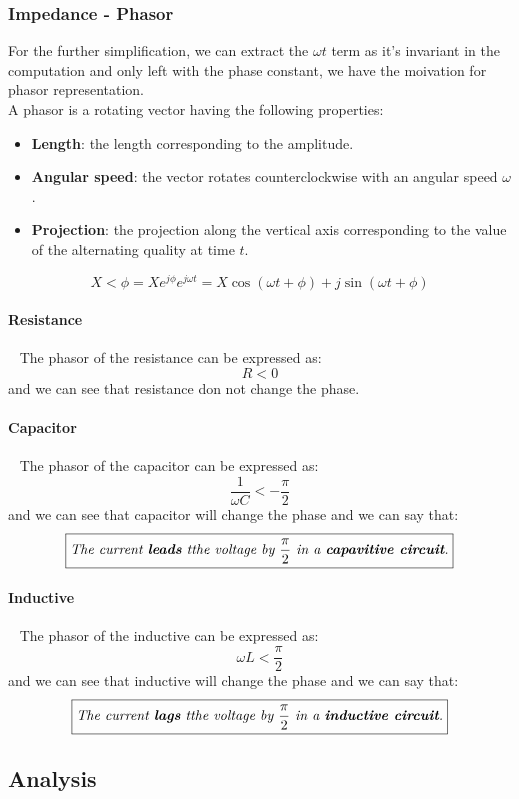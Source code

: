 \documentclass[UTF8]{article}
\begin{document}
\subsubsection{Impedance - Phasor} 
For the further simplification, we can extract the $\omega t$ term as it's invariant in the computation and only left with the phase constant, we have the moivation for phasor representation. \\ 
A phasor is a rotating vector having the following properties:
\begin{itemize}
\item  {\textbf{Length}}: the length corresponding to the amplitude.
\item  {\textbf{Angular speed}}: the vector rotates counterclockwise with an angular speed $\omega $.
\item  {\textbf{Projection}}: the projection along the vertical axis corresponding to the value of the alternating quality at time $t$.
\end{itemize}
$$X<\phi = Xe^{j\phi}e^{j\omega t} = X\cos (\omega t+\phi)+j\sin (\omega t+\phi)$$

\paragraph{Resistance}
~ {The phasor of the resistance can be expressed as:}
$$R<0$$
 {and we can see that resistance don not change the phase.}

\paragraph{Capacitor}
~ {The phasor of the capacitor can be expressed as:}
$$\dfrac{1}{\omega C}<-\dfrac{\pi}{2}$$
 {and we can see that capacitor will change the phase and we can say that:}
$$\boxed{\textit{The current \textbf{leads} tthe voltage by }\dfrac{\pi}{2}\textit{ in a \textbf{capavitive circuit}.}}$$

\paragraph{Inductive}
~ {The phasor of the inductive can be expressed as:}
$$\omega L<\dfrac{\pi}{2}$$
 {and we can see that inductive will change the phase and we can say that:}
$$\boxed{\textit{The current \textbf{lags} tthe voltage by }\dfrac{\pi}{2}\textit{ in a \textbf{inductive circuit}.}}$$


\pagebreak
\subsection{Analysis}
\end{document}
